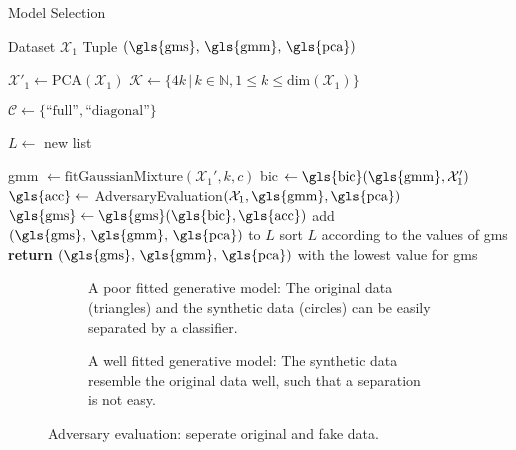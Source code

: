 \documentclass[../../main.tex]{subfiles}
\begin{document}
\begin{algorithm}
    \caption{Model Selection}
    \label{alg:model_selection}
    \begin{algorithmic}[1]
        \REQUIRE Dataset $\mathcal{X}_1$
        \ENSURE Tuple $(\text{\gls{gms}, \gls{gmm}, \gls{pca}})$

        \STATE $\mathcal{X}'_1 \leftarrow \text{PCA}(\mathcal{X}_1)$
        \STATE $\mathcal{K} \leftarrow \{ 4k \, | \,  k\in \mathbb{N}, 1 \leq k \leq \text{dim}(\mathcal{X}_1) \}$
        
        \STATE $\mathcal{C} \leftarrow \{\text{``full''}, \text{``diagonal''}\}$

        \STATE $L \leftarrow$ new list

                \STATE \gls{gmm} $\leftarrow \text{fitGaussianMixture}(\mathcal{X}_1', k, c)$
                \STATE \gls{bic} $\leftarrow \text{\gls{bic}}(\text{\gls{gmm}}, \mathcal{X}_1')$
                \STATE $\text{\gls{acc}} \leftarrow$ AdversaryEvaluation$(\mathcal{X}_1, \text{\gls{gmm}}, \text{\gls{pca}})$
                \STATE $\text{\gls{gms}} \leftarrow \text{\gls{gms}}(\text{\gls{bic}}, \text{\gls{acc}})$
                \STATE add $(\text{\gls{gms}, \gls{gmm}, \gls{pca}})$ to $L$
            \ENDFOR
        \ENDFOR
        \STATE sort $L$ according to the values of \gls{gms} 
        \STATE \textbf{return} $(\text{\gls{gms}, \gls{gmm}, \gls{pca}})$ with the lowest value for \gls{gms}
    \end{algorithmic}
 \end{algorithm}

 \begin{figure}[t!]%
    \centering%
    \begin{subfigure}[b]{0.49\textwidth}%
        \centering\captionsetup{width=.8\linewidth}%
        \caption{A poor fitted generative model: The original data (triangles) and the synthetic data (circles) can be easily separated by a classifier.}%
        \label{subfig:adversary_evaluation_bad}%
    \end{subfigure}%
    \hfill%
    \begin{subfigure}[b]{0.49\textwidth}%
        \centering\captionsetup{width=.8\linewidth}%
        \caption{A well fitted generative model: The synthetic data resemble the original data well, such that a separation is not easy.}%
        \label{subfig:adversary_evaluation_good}%
    \end{subfigure}%
    \caption{Adversary evaluation: seperate original and fake data.}%
    \label{fig:adversary_evaluation}%
\end{figure}%
\end{document}
